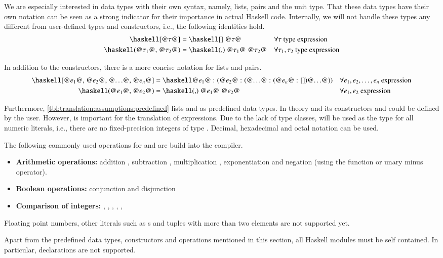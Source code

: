 We are especially interested in data types with their own syntax, namely, lists, pairs and the unit type.
That these data types have their own notation can be seen as a strong indicator for their importance in actual Haskell code.
Internally, we will not handle these types any different from user-defined types and constructors, i.e., the following identities hold.
\begin{align*}
  \haskellM{[@$\tau$@]}
  &= \haskellM{[] @$\tau$@}
  &&\forall \tau \text{ type expression}
  \\
  \haskellM{(@$\tau_1$@, @$\tau_2$@)}
  &= \haskellM{(,) @$\tau_1$@ @$\tau_2$@}
  &&\forall \tau_1, \tau_2 \text{ type expression}
\end{align*}

In addition to the constructors, there is a more concise notation for lists and pairs.
\begin{align}
  \haskellM{[@$e_1$@, @$e_2$@, @$\ldots$@, @$e_n$@]}
  &= \haskellM{@$e_1$@ : (@$e_2$@ : (@$\ldots$@ : (@$e_n$@ : [])@$\ldots$@))}
  &&\forall e_1, e_2, \ldots, e_n \text{ expression}
  \label{eqn:translation:assumptions:list-literal}
  \\
  \haskellM{(@$e_1$@, @$e_2$@)}
  &= \haskellM{(,) @$e_1$@ @$e_2$@}
  &&\forall e_1, e_2 \text{ expression}
  \label{eqn:translation:assumptions:pair-literal}
\end{align}

Furthermore, \autoref{tbl:translation:assumptions:predefined} lists  and  as predefined data types.
In theory  and its constructors  and  could be defined by the user.
However,  is important for the translation of  expressions.
Due to the lack of type classes,  will be used as the type for all numeric literals, i.e., there are no fixed-precision integers of type .
Decimal, hexadecimal and octal notation can be used.

The following commonly used operations for  and  are build into the compiler.
\begin{itemize}
  \item \textbf{Arithmetic operations:} addition \haskell{(+)}, subtraction \haskell{(-)}, multiplication \haskell{(*)}, exponentiation \haskell{(^)} and negation (using the  function or unary minus operator).
  \item \textbf{Boolean operations:} conjunction \haskell{(&&)} and disjunction \haskell{(||)}
  \item \textbf{Comparison of integers:} \haskell{(<=)}, \haskell{(<)}, \haskell{(==)}, \haskell{(/=)}, \haskell{(>=)}, \haskell{(>)}
\end{itemize}
Floating point numbers, other literals such as s and tuples with more than two elements are not supported yet.

Apart from the predefined data types, constructors and operations mentioned in this section, all Haskell modules must be self contained.
In particular,  declarations are not supported.
